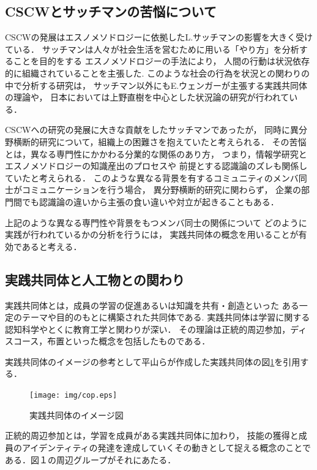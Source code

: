 \documentclass[submit,techrep]{ipsj}
\begin{document}
\subsection{CSCWとサッチマンの苦悩について}
CSCWの発展はエスノメソドロジーに依拠したL.サッチマンの影響を大きく受けている．
サッチマンは人々が社会生活を営むために用いる「やり方」を分析することを目的をする
エスノメソドロジー\cite{book3}の手法により，
人間の行動は状況依存的に組織されていることを主張した\cite{book4}.
このような社会の行為を状況との関わりの中で分析する研究は，
サッチマン以外にもE.ウェンガーが主張する実践共同体\cite{book5}の理論や，
日本においては上野直樹を中心とした状況論の研究が行われている\cite{book6}．

CSCWへの研究の発展に大きな貢献をしたサッチマンであったが，
同時に異分野横断的研究について，組織上の困難さを抱えていたと考えられる\cite{book7}．
その苦悩とは，異なる専門性にかかわる分業的な関係のあり方，
つまり，情報学研究とエスノメソドロジーの知識産出のプロセスや
前提とする認識論のズレも関係していたと考えられる\cite{book8}．
このような異なる背景を有するコミュニティのメンバ同士がコミュニケーションを行う場合，
異分野横断的研究に関わらず，
企業の部門間でも認識論の違いから主張の食い違いや対立が起きることもある\cite{book9}．

上記のような異なる専門性や背景をもつメンバ同士の関係について
どのように実践が行われているかの分析を行うには，
実践共同体の概念を用いることが有効であると考える．

\subsection{実践共同体と人工物との関わり}


実践共同体とは，成員の学習の促進あるいは知識を共有・創造といった
ある一定のテーマや目的のもとに構築された共同体である.
実践共同体は学習に関する認知科学やとくに教育工学と関わりが深い．
その理論は正統的周辺参加，ディスコース，布置といった概念を包括したものである．

実践共同体のイメージの参考として平山\cite{book10}らが作成した実践共同体の図\ref{cop}を引用する．
\begin{figure}[h]
  \centering
  \texttt{[image: img/cop.eps]}
  \caption{実践共同体のイメージ図}
  \label{cop}
\end{figure}
正統的周辺参加とは，学習を成員がある実践共同体に加わり，
技能の獲得と成員のアイデンティティの発達を達成していくその動きとして捉える概念のことである．図１の周辺グループがそれにあたる．
\end{document}
